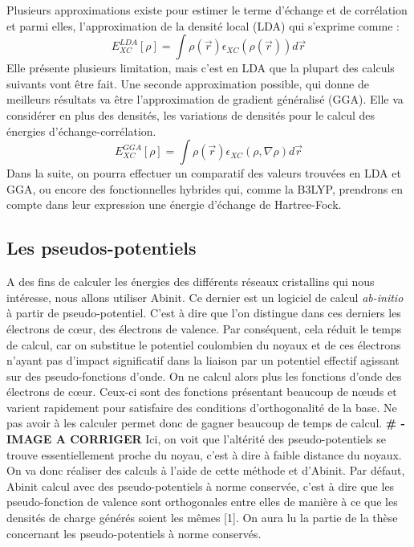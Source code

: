 \documentclass[oneside,finale,10pt]{report}
\begin{document}
Plusieurs approximations existe pour estimer le terme d'échange et de corrélation et parmi elles, l'approximation de la densité local (LDA) qui s'exprime comme :
\begin{equation*}
E^{LDA}_{XC}[\rho] = \int \rho(\vec{r})\epsilon_{XC}(\rho(\vec{r}))d\vec{r}
\end{equation*}
Elle présente plusieurs limitation, mais c'est en LDA que la plupart des calculs suivants vont être fait. Une seconde approximation possible, qui donne de meilleurs résultats va être l'approximation de gradient généralisé (GGA). Elle va considérer en plus des densités, les variations de densités pour le calcul des énergies d'échange-corrélation.
\begin{equation*}
E^{GGA}_{XC}[\rho] = \int  \rho(\vec{r})\epsilon_{XC}
(\rho,\nabla\rho)d\vec{r}
\end{equation*}
Dans la suite, on pourra effectuer un comparatif des valeurs trouvées en LDA et GGA, ou encore des fonctionnelles hybrides qui, comme la B3LYP, prendrons en compte dans leur expression une énergie d'échange de Hartree-Fock.

\subsection{Les pseudos-potentiels}

\hspace*{20px}A des fins de calculer les énergies des différents réseaux cristallins qui nous intéresse, nous allons utiliser Abinit. Ce dernier est un logiciel de calcul \textit{ab-initio} à partir de pseudo-potentiel. C'est à dire que l'on distingue dans ces derniers les électrons de cœur, des électrons de valence. Par conséquent, cela réduit le temps de calcul, car on substitue le potentiel coulombien du noyaux et de ces électrons n'ayant pas d'impact significatif dans la liaison par un potentiel effectif agissant sur des pseudo-fonctions d'onde. On ne calcul alors plus les fonctions d'onde des électrons de cœur. Ceux-ci sont des fonctions présentant beaucoup de nœuds et varient rapidement pour satisfaire des conditions d'orthogonalité de la base. Ne pas avoir à les calculer permet donc de gagner beaucoup de temps de calcul.
\newline
\newline
\textbf{\# - IMAGE A CORRIGER}
\newline
\newline
Ici, on voit que l'altérité des pseudo-potentiels se trouve essentiellement proche du noyau, c'est à dire à faible distance du noyaux. On va donc réaliser des calculs à l'aide de cette méthode et d'Abinit.
Par défaut, Abinit calcul avec des pseudo-potentiels à norme conservée, c'est à dire que les pseudo-fonction de valence sont orthogonales entre elles de manière à ce que les densités de charge générés soient les mêmes [1]. On aura lu la partie de la thèse concernant les pseudo-potentiels à norme conservés.
\end{document}
